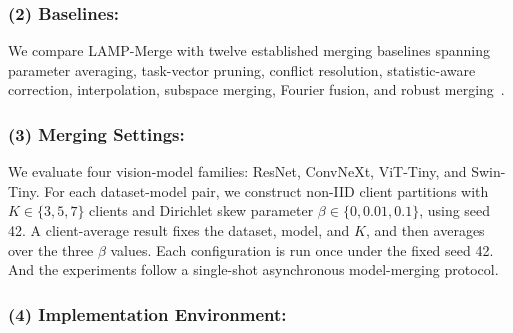 \documentclass[letterpaper]{article} %
\begin{document}
\subsubsection{(2) Baselines:}

We compare LAMP-Merge with twelve established merging baselines spanning parameter averaging, task-vector pruning, conflict resolution, statistic-aware correction, interpolation, subspace merging, Fourier fusion, and robust merging~\cite{yadav2023tiesmergingresolvinginterferencemerging,yu2024languagemodelssupermario,jin2025datalessknowledgefusionmerging,wu_parameter_2025,davari2024modelbreadcrumbsscalingmultitask,jang2025modelstockneedjust,ilharco2023editingmodelstaskarithmetic,marczak2025taskleftbehindisotropic,zheng2025freemergingfouriertransformefficient,zeng2025robustmergeparameterefficientmodelmerging}.

\subsubsection{(3) Merging Settings:}



We evaluate four vision-model families: ResNet, ConvNeXt, ViT-Tiny, and Swin-Tiny\cite{he2016deep,liu2022convnet,dosovitskiy2021image,liu2021swin}. For each dataset-model pair, we construct non-IID client partitions with $K\in\{3,5,7\}$ clients and Dirichlet skew parameter $\beta\in\{0,0.01,0.1\}$, using seed 42\cite{hsu2019measuringeffectsnonidenticaldata}. A client-average result fixes the dataset, model, and $K$, and then averages over the three $\beta$ values. Each configuration is run once under the fixed seed 42. And the experiments follow a single-shot asynchronous model-merging protocol.

\subsubsection{(4) Implementation Environment:}
\end{document}
